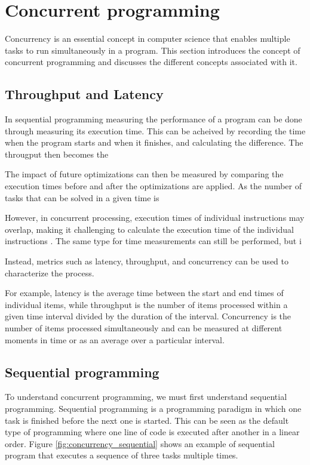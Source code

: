 \section{Concurrent programming}
Concurrency is an essential concept in computer science that enables multiple tasks to run simultaneously in a program.
This section introduces the concept of concurrent programming and discusses the different concepts associated with it.


\subsection{Throughput and Latency}
In sequential programming measuring the performance of a program can be done through measuring its execution time.
This can be acheived by recording the time when the program starts and when it finishes, and calculating the difference.
The througput then becomes the

The impact of future optimizations can then be measured by comparing the execution times before and after the optimizations are applied.
As the number of tasks that can be solved in a given time is

However, in concurrent processing, execution times of individual instructions may overlap, making it challenging to calculate the execution time of the individual instructions \cite[21]{volkovLatencyHiding2016}.
The same type for time measurements can still be performed, but i

Instead, metrics such as latency, throughput, and concurrency can be used to characterize the process.

For example, latency is the average time between the start and end times of individual items, while throughput is the number of items processed within a given time interval divided by the duration of the interval.
Concurrency is the number of items processed simultaneously and can be measured at different moments in time or as an average over a particular interval.


\subsection{Sequential programming}
To understand concurrent programming, we must first understand sequential programming.
Sequential programming is a programming paradigm in which one task is finished before the next one is started.
This can be seen as the default type of programming where one line of code is executed after another in a linear order.
Figure \ref{fig:concurrency_sequential} shows an example of sequential program that executes a sequence of three tasks multiple times.

